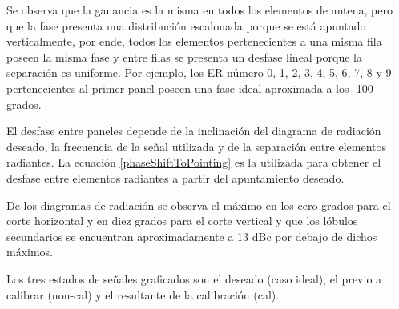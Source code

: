 Se observa que la ganancia es la misma en todos los elementos de antena, pero que la fase presenta una distribución escalonada
porque se está apuntado verticalmente, por ende, todos los elementos pertenecientes a una misma fila poseen la misma fase y entre
filas se presenta un desfase lineal porque la separación es uniforme. Por ejemplo, los ER número 0, 1, 2, 3, 4, 5, 6, 7, 8 y 9
pertenecientes al primer panel poseen una fase ideal aproximada a los -100 grados.

El desfase entre paneles depende de la inclinación del diagrama de radiación deseado, la frecuencia de la señal utilizada y de la
separación entre elementos radiantes. La ecuación \ref{phaseShiftToPointing} es la utilizada para obtener el desfase entre 
elementos radiantes a partir del apuntamiento deseado.

De los diagramas de radiación se observa el máximo en los cero grados para el corte horizontal y en diez grados para el corte
vertical y que los lóbulos secundarios se encuentran aproximadamente a 13 dBc por debajo de dichos máximos.

Los tres estados de señales graficados son el deseado (caso ideal), el previo a calibrar (non-cal) y el resultante de la
calibración (cal).

